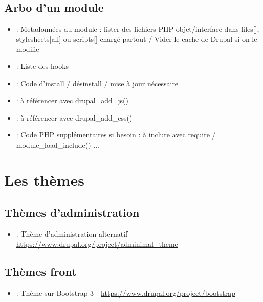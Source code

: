 \documentclass[a4paper,11pt,french]{rtdsphinxmanual}
\begin{document}
\section{Arbo d'un module}
\label{modules:arbo-d-un-module}\begin{itemize}
\item {} 
 : Metadonnées du module : lister des fichiers PHP objet/interface dans files{[}{]}, stylesheets{[}all{]} ou scripts{[}{]} chargé partout / Vider le cache de Drupal si on le modifie

\item {} 
 : Liste des hooks

\item {} 
 : Code d'install / désinstall / mise à jour nécessaire

\item {} 
 : à référencer avec drupal\_add\_js()

\item {} 
 : à référencer avec drupal\_add\_css()

\item {} 
 : Code PHP supplémentaires si besoin : à inclure avec require / module\_load\_include() ...

\end{itemize}


\chapter{Les thèmes}
\label{themes:les-themes}\label{themes::doc}

\section{Thèmes d'administration}
\label{themes:themes-d-administration}\begin{itemize}
\item {} 
 : Thème d'administration alternatif - \href{https://www.drupal.org/project/adminimal\_theme}{https://www.drupal.org/project/adminimal\_theme}

\end{itemize}


\section{Thèmes front}
\label{themes:themes-front}\begin{itemize}
\item {} 
 : Thème sur Bootstrap 3 - \href{https://www.drupal.org/project/bootstrap}{https://www.drupal.org/project/bootstrap}

\end{itemize}
\end{document}
